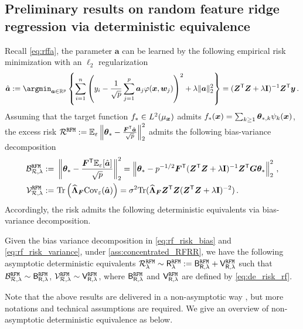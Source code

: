 \subsection{Preliminary results on random feature ridge regression via deterministic equivalence}
\label{app:pre_rfrr}

Recall \cref{eq:rffa}, the parameter $\bm a$ can be learned by the following empirical risk minimization with an $\ell_2$ regularization 
\[
    \hat{\ba} := \argmin_{\ba \in \mathbb{R}^p} \left\{ \sum_{i =1}^n \left(y_i - \frac{1}{\sqrt{p}} \sum_{j=1}^p \bm a_j \varphi(\bm x, \bm w_j) \right)^2 + \lambda \|\ba\|_2^2 \right\} = (\bZ^\sT \bZ + \lambda \id)^{-1} \bZ^\sT \by\,.
\]
Assuming that the target function $f_* \in L^2(\mu_{\boldsymbol x})$ admits $f_*({\boldsymbol x})=\sum_{k\geq1}{\boldsymbol \theta}_{*,k}\psi_k({\boldsymbol x})$, the excess risk $\mathcal{R}^{\tt RFM} := \mathbb{E}_{\varepsilon} \left\|{\boldsymbol \theta}_* - \frac{{\boldsymbol F}^{\mathsf T}\hat{{\boldsymbol a}}}{\sqrt{p}}\right\|_2^2$ admits the following bias-variance decomposition
\begin{align}
    \mathcal{B}_{\mathcal{R},\lambda}^{\tt RFM} :=&~ \left\|{\boldsymbol \theta}_* - \frac{{\boldsymbol F}^{\mathsf T} \mathbb{E}_{\varepsilon}[\hat{{\boldsymbol a}}]}{\sqrt{p}}\right\|_2^2 = \left\|{\boldsymbol \theta}_* - p^{-1/2} {\boldsymbol F}^{\mathsf T} ({\boldsymbol Z}^{\mathsf T} {\boldsymbol Z} + \lambda{\mathbf I})^{-1} {\boldsymbol Z}^{\mathsf T} {\boldsymbol G} \bm \theta_* \right\|_2^2\,,\label{eq:rf_risk_bias}\\
    \mathcal{V}_{\mathcal{R},\lambda}^{\tt RFM} :=&~ {\rm Tr}\left(\widehat{{\boldsymbol \Lambda}}_{\boldsymbol F} \mathrm{Cov}_{\varepsilon}(\hat{{\boldsymbol a}})\right) = \sigma^2{\rm Tr}(\widehat{{\boldsymbol \Lambda}}_{\boldsymbol F} {\boldsymbol Z}^{\mathsf T}{\boldsymbol Z}({\boldsymbol Z}^{\mathsf T}{\boldsymbol Z}+\lambda{\mathbf I})^{-2}) \,.\label{eq:rf_risk_variance}
\end{align}
Accordingly, the risk admits the following deterministic equivalents via bias-variance decomposition.
\begin{proposition}\citep[Asymptotic version of Theorem 3.3]{defilippis2024dimension}\label{prop:asy_equiv_risk_RFRR}
    Given the bias variance decomposition in \cref{eq:rf_risk_bias} and \cref{eq:rf_risk_variance}, 
    under \cref{ass:concentrated_RFRR}, we have the following asymptotic deterministic equivalents $\mathcal{R}_{\lambda}^{\tt RFM}  \sim \mathsf R_{\lambda}^{\tt RFM} := \mathsf B_{\mathsf R,\lambda}^{\tt RFM} + \mathsf V_{\mathsf R,\lambda}^{\tt RFM}$ such that $\mathcal{B}^{\tt RFM}_{\mathcal{R},\lambda} \sim \mathsf B_{\mathsf R,\lambda}^{\tt RFM}$, $\mathcal{V}^{\tt RFM}_{\mathcal{R},\lambda} \sim \mathsf V_{\mathsf R,\lambda}^{\tt RFM}$, where $\mathsf B_{\mathsf R,\lambda}^{\tt RFM}$ and $\mathsf V_{\mathsf R,\lambda}^{\tt RFM}$ are defined by \cref{eq:de_risk_rf}.
\end{proposition}
Note that the above results are delivered in a non-asymptotic way \citep{defilippis2024dimension}, but more notations and technical assumptions are required. We give an overview of non-asymptotic deterministic equivalence as below.